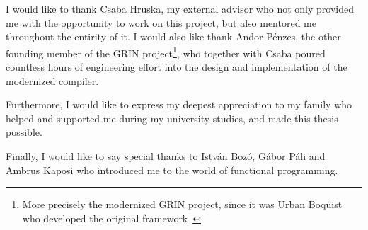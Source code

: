 \documentclass[main.tex]{subfiles}
\begin{document}
	
	I would like to thank Csaba Hruska, my external advisor who not only provided me with the opportunity to work on this project, but also mentored me throughout the entirity of it. I would also like thank Andor Pénzes, the other founding member of the GRIN project\footnote{More precisely the modernized GRIN project, since it was Urban Boquist who developed the original framework~\cite{boquist-phd}}, who together with Csaba poured countless hours of engineering effort into the design and implementation of the modernized compiler.
	
	Furthermore, I would like to express my deepest appreciation to my family who helped and supported me during my university studies, and made this thesis possible.
	
	Finally, I would like to say special thanks to István Bozó, Gábor Páli and Ambrus Kaposi who introduced me to the world of functional programming.
	
\end{document}
